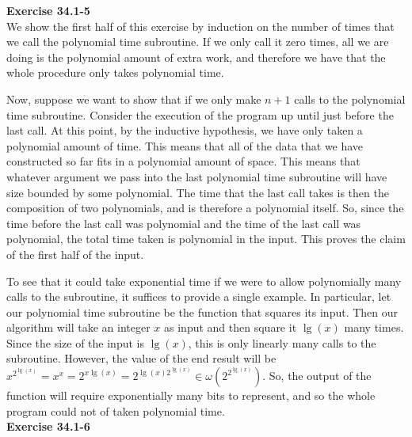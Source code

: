 \documentclass{article}
\begin{document}
\noindent\textbf{Exercise 34.1-5}\\

We show the first half of this exercise by induction on the number of times that we call the polynomial time subroutine. If we only call it zero times, all we are doing is the polynomial amount of extra work, and therefore we have that the whole procedure only takes polynomial time.

Now, suppose we want to show that if we only make $n+1$ calls to the polynomial time subroutine. Consider the execution of the program up until just before the last call. At this point, by the inductive hypothesis, we have only taken a polynomial amount of time. This means that all of the data that we have constructed so far fits in a polynomial amount of space. This means that whatever argument we pass into the last polynomial time subroutine will have size bounded by some polynomial. The time that the last call takes is then the composition of two polynomials, and is therefore a polynomial itself. So, since the time before the last call was polynomial and the time of the last call was polynomial, the total time taken is polynomial in the input. This proves the claim of the first half of the input.

To see that it could take exponential time if we were to allow polynomially many calls to the subroutine, it suffices to provide a single example. In particular, let our polynomial time subroutine be the function that squares its input. Then our algorithm will take an integer $x$ as input and then square it $\lg(x)$ many times. Since the size of the input is $\lg(x)$, this is only linearly many calls to the subroutine. However, the value of the end result will be $x^{2^{\lg(x)}} = x^x = 2^{x\lg(x)} =2^{\lg(x)2^{\lg(x)}} \in \omega(2^{2^{\lg(x)}})$. So, the output of the function will require exponentially many bits to represent, and so the whole program could not of taken polynomial time.\\

\noindent\textbf{Exercise 34.1-6}\\
\end{document}

